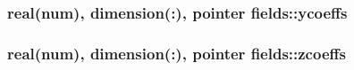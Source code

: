 \subsubsection[{\texorpdfstring{ycoeffs}{ycoeffs}}]{\setlength{\rightskip}{0pt plus 5cm}real(num), dimension(\+:), pointer fields\+::ycoeffs}\hypertarget{namespacefields_a13ae96bfb25ee0698529585220416d5e}{}\label{namespacefields_a13ae96bfb25ee0698529585220416d5e}
\subsubsection[{\texorpdfstring{zcoeffs}{zcoeffs}}]{\setlength{\rightskip}{0pt plus 5cm}real(num), dimension(\+:), pointer fields\+::zcoeffs}\hypertarget{namespacefields_aab4aa30b16b003222aa946420ff709d6}{}\label{namespacefields_aab4aa30b16b003222aa946420ff709d6}
